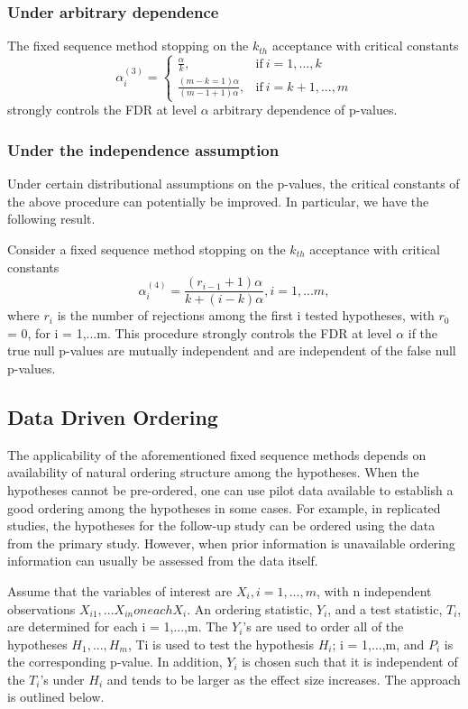 \documentclass{article}
\begin{document}
\subsubsection{Under arbitrary dependence}
The fixed sequence method stopping on the $k_{th}$ acceptance with critical constants
$$ \alpha_i^{(3)} = \begin{cases}
                    \frac{\alpha}{k}, & \text{if}\ i = 1,...,k \\
                    \frac{(m-k=1)\alpha}{(m-1+1)\alpha}, &  \text{if}\ i = k+1,...,m
                    \end{cases} $$
 strongly controls the FDR at level $\alpha$ arbitrary dependence of p-values. 
 
\subsubsection{Under the independence assumption}
Under certain distributional assumptions on the p-values, the critical constants of the above procedure can potentially be
improved. In particular, we have the following result.

Consider a fixed sequence method stopping on the $k_{th}$ acceptance with critical constants
$$ \alpha_i^{(4)} = \frac{(r_{i-1}+1)\alpha}{k+(i-k)\alpha} , i = 1,...m, $$ where $r_i$ is the number of rejections among the first i tested hypotheses, with $r_0$ = 0, for i = 1,...m. 
This procedure strongly controls the FDR at level $\alpha$ if the true null p-values are mutually independent and are independent of the false null p-values.

\subsection{Data Driven Ordering}
The applicability of the aforementioned fixed sequence methods depends on availability of natural ordering structure among the hypotheses. When the hypotheses cannot be pre-ordered, one can use pilot data available to establish a good ordering among the hypotheses in some cases. For example, in replicated studies, the hypotheses for the follow-up study can be ordered using the data from the primary study. However, when prior information is unavailable ordering information can usually be assessed from the data itself. 

Assume that the variables of interest are $X_i, i = 1,...,m$, with n independent observations $X_{i1},...X_{in} on each X_i$. An ordering statistic, $Y_i$, and a test statistic, $T_i$, are determined for each i = 1,...,m. The $Y_i$’s are used to order all of the hypotheses $H_1,...,H_m$, Ti is used to test the hypothesis $H_i$; i = 1,...,m, and $P_i$ is the corresponding p-value. In addition, $Y_i$ is chosen such that it is independent of the $T_i$’s under $H_i$ and tends to be larger as the effect size increases. The approach is outlined below.
\end{document}
